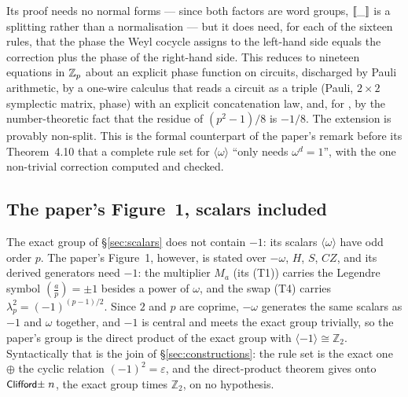 Its proof needs no normal forms --- since both factors are word groups,
$[\![\_]\!]$ is a splitting rather than a normalisation --- but it does
need, for each of the sixteen rules, that the phase the Weyl cocycle
assigns to the left-hand side equals the correction plus the phase of
the right-hand side.  This reduces to nineteen equations in $\mathbb{Z}_p$ about
an explicit phase function on circuits, discharged by Pauli arithmetic,
by a one-wire calculus that reads a circuit as a triple (Pauli, $2
\times 2$ symplectic matrix, phase) with an explicit concatenation law,
and, for , by the number-theoretic fact that the residue
of $(p^2-1)/8$ is $-1/8$.  The extension is provably non-split.  This
is the formal counterpart of the paper's remark before its Theorem~4.10
that a complete rule set for $\langle\omega\rangle$ ``only needs
$\omega^{d} = 1$'', with the one non-trivial correction computed and
checked.

\subsection{The paper's Figure~1, scalars included}\label{sec:figure1}

The exact group of \S\ref{sec:scalars} does not contain $-1$: its
scalars $\langle\omega\rangle$ have odd order $p$.  The paper's
Figure~1, however, is stated over $-\omega$, $H$, $S$, $CZ$, and its
derived generators need $-1$: the multiplier $M_a$ (its (T1)) carries
the Legendre symbol $(\frac{a}{p}) = \pm 1$ besides a power of $\omega$,
and the swap (T4) carries $\lambda_p^2 = (-1)^{(p-1)/2}$.  Since $2$ and
$p$ are coprime, $-\omega$ generates the same scalars as $-1$ and
$\omega$ together, and $-1$ is central and meets the exact group
trivially, so the paper's group is the direct product of the exact
group with $\langle -1\rangle \cong \mathbb Z_2$.  Syntactically that is
the join of \S\ref{sec:constructions}: the rule set
 is the exact one $\oplus$ the cyclic relation
$(-1)^2 = \varepsilon$, and the direct-product theorem gives
 onto $\mbox{\textsf{\small Clifford±}}\;n$, the exact group
times $\mathbb Z_2$, on no hypothesis.

